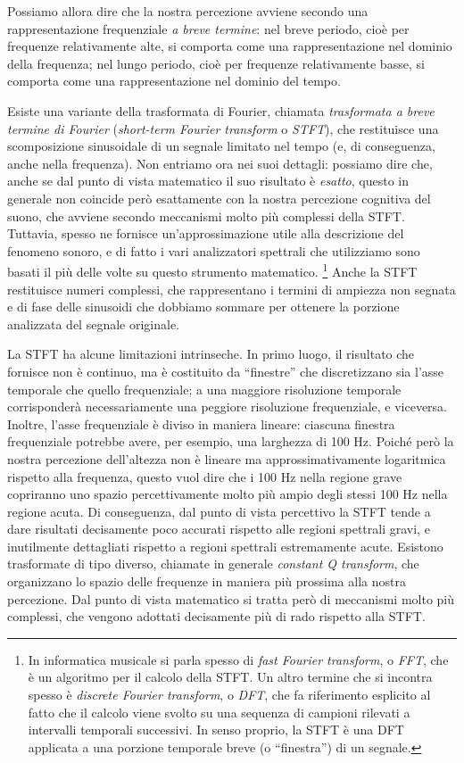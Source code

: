 Possiamo allora dire che la nostra percezione avviene secondo una rappresentazione frequenziale \emph{a breve termine}: nel breve periodo, cioè per frequenze relativamente alte, si comporta come una rappresentazione nel dominio della frequenza; nel lungo periodo, cioè per frequenze relativamente basse, si comporta come una rappresentazione nel dominio del tempo.

Esiste una variante della trasformata di Fourier, chiamata \emph{trasformata a breve termine di Fourier} (\emph{short-term Fourier transform} o \emph{STFT}), che restituisce una scomposizione sinusoidale di un segnale limitato nel tempo (e, di conseguenza, anche nella frequenza). Non entriamo ora nei suoi dettagli: possiamo dire che, anche se dal punto di vista matematico il suo risultato è \emph{esatto}, questo in generale non coincide però esattamente con la nostra percezione cognitiva del suono, che avviene secondo meccanismi molto più complessi della STFT. Tuttavia, spesso ne fornisce un'approssimazione utile alla descrizione del fenomeno sonoro, e di fatto i vari analizzatori spettrali che utilizziamo sono basati il più delle volte su questo strumento matematico.%
\footnote{In informatica musicale si parla spesso di \emph{fast Fourier transform}, o \emph{FFT}, che è un algoritmo per il calcolo della STFT. Un altro termine che si incontra spesso è \emph{discrete Fourier transform}, o \emph{DFT}, che fa riferimento esplicito al fatto che il calcolo viene svolto su una sequenza di campioni rilevati a intervalli temporali successivi. In senso proprio, la STFT è una DFT applicata a una porzione temporale breve (o ``finestra'') di un segnale.}
Anche la STFT restituisce numeri complessi, che rappresentano i termini di ampiezza non segnata e di fase delle sinusoidi che dobbiamo sommare per ottenere la porzione analizzata del segnale originale. 

La STFT ha alcune limitazioni intrinseche. In primo luogo, il risultato che fornisce non è continuo, ma è costituito da ``finestre'' che discretizzano sia l'asse temporale che quello frequenziale; a una maggiore risoluzione temporale corrisponderà necessariamente una peggiore risoluzione frequenziale, e viceversa. Inoltre, l'asse frequenziale è diviso in maniera lineare: ciascuna finestra frequenziale potrebbe avere, per esempio, una larghezza di 100 Hz. Poiché però la nostra percezione dell'altezza non è lineare ma approssimativamente logaritmica rispetto alla frequenza, questo vuol dire che i 100 Hz nella regione grave copriranno uno spazio percettivamente molto più ampio degli stessi 100 Hz nella regione acuta. Di conseguenza, dal punto di vista percettivo la STFT tende a dare risultati decisamente poco accurati rispetto alle regioni spettrali gravi, e inutilmente dettagliati rispetto a regioni spettrali estremamente acute. Esistono trasformate di tipo diverso, chiamate in generale \emph{constant Q transform}, che organizzano lo spazio delle frequenze in maniera più prossima alla nostra percezione. Dal punto di vista matematico si tratta però di meccanismi molto più complessi, che vengono adottati decisamente più di rado rispetto alla STFT. 


